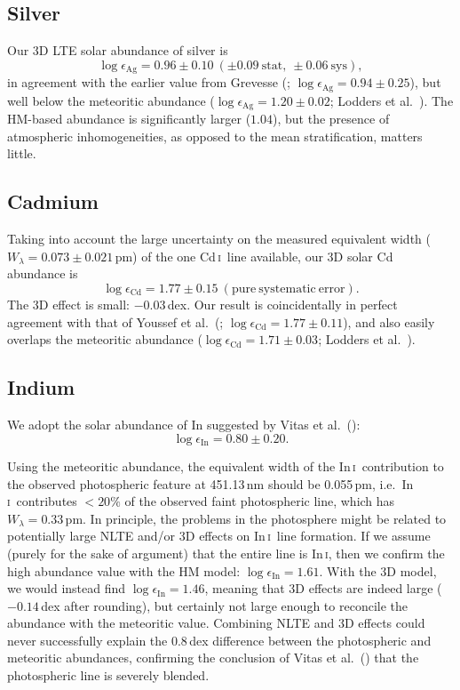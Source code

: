 \documentclass[traditabstract]{aa}
\newcommand{\altcdi}{Cd\,\textsc{i}}
\newcommand{\altini}{In\,\textsc{i}}
\newcommand{\cdi}{\altcdi\ }
\newcommand{\ini}{\altini\ }
\begin{document}
\subsection{Silver}
Our 3D LTE solar abundance of silver is
\begin{displaymath}
\log\epsilon_{\mathrm{Ag}}=0.96\pm0.10\ (\pm0.09\ \mathrm{stat},\ \pm0.06\ \mathrm{sys}),
\end{displaymath}
in agreement with the earlier value from Grevesse (\cite{grev}; $\log\epsilon_{\mathrm{Ag}}=0.94\pm0.25$), but well below the meteoritic abundance ($\log \epsilon_{\mathrm{Ag}}=1.20\pm0.02$; Lodders et al.\ \cite{lodd}). The HM-based abundance is significantly larger ($1.04$), but the presence of atmospheric inhomogeneities, as opposed to the mean stratification, matters little.

\subsection{Cadmium}
Taking into account the large uncertainty on the measured equivalent width ($W_\lambda = 0.073\pm 0.021$\,pm) of the one \cdi line available, our 3D solar Cd abundance is
\begin{displaymath}
\log\epsilon_{\mathrm{Cd}}=1.77\pm0.15\ \mathrm{(pure\ systematic\ error)}.
\end{displaymath}
The 3D effect is small: $-0.03$\,dex.  Our result is coincidentally in perfect agreement with that of Youssef et al.\ (\cite{yous}; $\log\epsilon_{\mathrm{Cd}}=1.77\pm0.11$), and also easily overlaps the meteoritic abundance ($\log \epsilon_{\mathrm{Cd}}=1.71\pm0.03$; Lodders et al.\ \cite{lodd}).

\subsection{Indium}
We adopt the solar abundance of In suggested by Vitas et al.\ (\cite{vita}):
\begin{displaymath}
\log\epsilon_{\mathrm{In}}=0.80\pm0.20.
\end{displaymath}

Using the meteoritic abundance, the equivalent width of the \ini contribution to the observed 
photospheric feature at 451.13\,nm should be 0.055\,pm, i.e.\ \ini contributes $<20\%$ of the
observed faint photospheric line, which has $W_\lambda=0.33$\,pm.  In principle, the problems 
in the photosphere might be related to potentially large NLTE and/or 3D effects on \ini line formation.
If we assume (purely for the sake of argument) that the entire line is \altini, then we confirm the high abundance
value with the HM model: $\log\epsilon_{\mathrm{In}}=1.61$.  With the 3D model, we would instead find 
$\log\epsilon_{\mathrm{In}}=1.46$, meaning that 3D effects are indeed large ($-0.14$\,dex after rounding), but certainly
not large enough to reconcile the abundance with the meteoritic value.  Combining NLTE and 3D effects
could never successfully explain the 0.8\,dex difference between the photospheric and meteoritic abundances, 
confirming the conclusion of Vitas et al.\ (\cite{vita}) that the photospheric line is severely blended.
\end{document}
